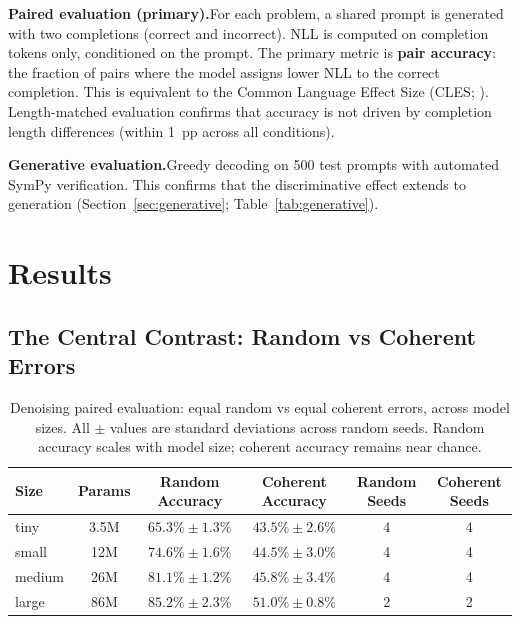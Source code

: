 \documentclass{article}
\begin{document}
\textbf{Paired evaluation (primary).}\quad For each problem, a shared prompt is generated with two completions (correct and incorrect). NLL is computed on completion tokens only, conditioned on the prompt. The primary metric is \textbf{pair accuracy}: the fraction of pairs where the model assigns lower NLL to the correct completion. This is equivalent to the Common Language Effect Size (CLES; \citealp{mcgraw1992common}). Length-matched evaluation confirms that accuracy is not driven by completion length differences (within 1~pp across all conditions).

\textbf{Generative evaluation.}\quad Greedy decoding on 500 test prompts with automated SymPy verification. This confirms that the discriminative effect extends to generation (Section~\ref{sec:generative}; Table~\ref{tab:generative}).

\section{Results}
\label{sec:results}

\subsection{The Central Contrast: Random vs Coherent Errors}
\label{sec:central}

\begin{table}[t]
\centering
\begin{tabular}{lccccc}
\toprule
Size & Params & Random Accuracy & Coherent Accuracy & Random Seeds & Coherent Seeds \\
\midrule
tiny   & 3.5M & $\mathbf{65.3\% \pm 1.3\%}$ & $43.5\% \pm 2.6\%$ & 4 & 4 \\
small  & 12M  & $\mathbf{74.6\% \pm 1.6\%}$ & $44.5\% \pm 3.0\%$ & 4 & 4 \\
medium & 26M  & $\mathbf{81.1\% \pm 1.2\%}$ & $45.8\% \pm 3.4\%$ & 4 & 4 \\
large  & 86M  & $\mathbf{85.2\% \pm 2.3\%}$ & $51.0\% \pm 0.8\%$ & 2 & 2 \\
\bottomrule
\end{tabular}
\caption{Denoising paired evaluation: equal random vs equal coherent errors, across model sizes. All $\pm$ values are standard deviations across random seeds. Random accuracy scales with model size; coherent accuracy remains near chance.}
\label{tab:central}
\end{table}
\end{document}
